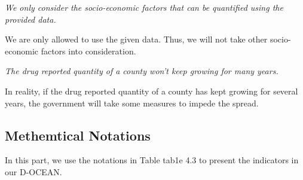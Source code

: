 \documentclass[a4paper]{article}
\begin{document}
\vspace{8pt}
\begin{assumption}
\textit{We only consider the socio-economic factors that can be quantified using the provided data.}
\end{assumption}
We are only allowed to use the given data. Thus, we will not take other socio-economic factors into consideration.

\vspace{8pt}
\begin{assumption}
\textit{The drug reported quantity of a county won't keep growing for many years.}
\end{assumption}
In reality, if the drug reported quantity of a county has kept growing for several years, the government will take some measures to impede the spread.


\subsection{Methemtical Notations}
In this part, we use the notations in Table tab1e 4.3 to present the indicators in our D-OCEAN.

\vspace{8pt}

\renewcommand{\baselinestretch}{1.3}
\begin{table}[h]
\begin{center}
\caption{Mathematical Notations}
\label{tab1e4.3}
\end{center}
\end{table}
\renewcommand{\baselinestretch}{1.0}
\end{document}
